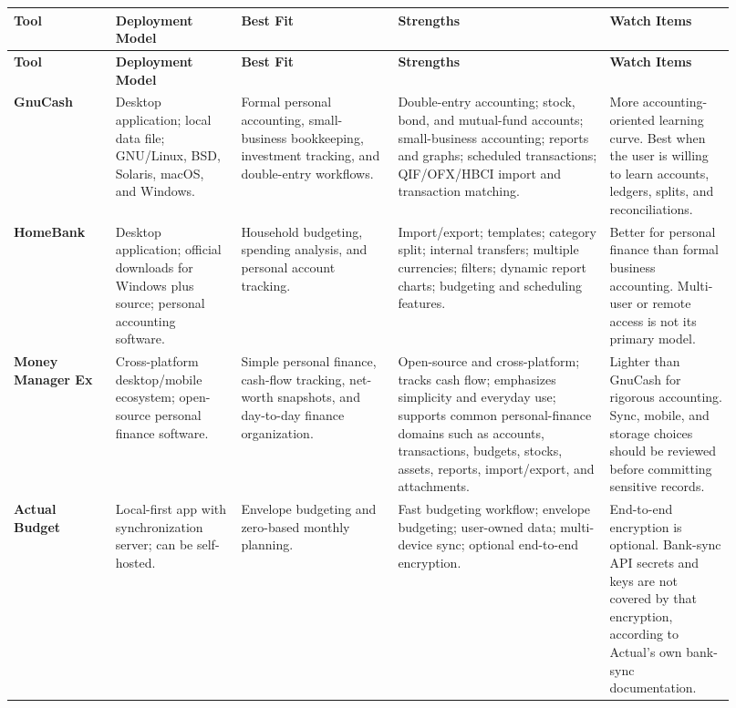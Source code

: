 \documentclass[11pt]{article}
\newcommand{\tool}[1]{\textbf{#1}}
\begin{document}
\begingroup
\small
{}
\begin{longtable}{>{\RaggedRight\arraybackslash}p{0.13\linewidth} >{\RaggedRight\arraybackslash}p{0.16\linewidth} >{\RaggedRight\arraybackslash}p{0.20\linewidth} >{\RaggedRight\arraybackslash}p{0.27\linewidth} >{\RaggedRight\arraybackslash}p{0.16\linewidth}}
\rowcolor{accentlight}\textbf{Tool} & \textbf{Deployment Model} & \textbf{Best Fit} & \textbf{Strengths} & \textbf{Watch Items} \\
\toprule
\endfirsthead
\rowcolor{accentlight}\textbf{Tool} & \textbf{Deployment Model} & \textbf{Best Fit} & \textbf{Strengths} & \textbf{Watch Items} \\
\toprule
\endhead
\tool{GnuCash} & Desktop application; local data file; GNU/Linux, BSD, Solaris, macOS, and Windows.\cite{gnucash-home} & Formal personal accounting, small-business bookkeeping, investment tracking, and double-entry workflows. & Double-entry accounting; stock, bond, and mutual-fund accounts; small-business accounting; reports and graphs; scheduled transactions; QIF/OFX/HBCI import and transaction matching.\cite{gnucash-home,gnucash-features} & More accounting-oriented learning curve. Best when the user is willing to learn accounts, ledgers, splits, and reconciliations. \\
\tool{HomeBank} & Desktop application; official downloads for Windows plus source; personal accounting software.\cite{homebank-home,homebank-downloads} & Household budgeting, spending analysis, and personal account tracking. & Import/export; templates; category split; internal transfers; multiple currencies; filters; dynamic report charts; budgeting and scheduling features.\cite{homebank-home} & Better for personal finance than formal business accounting. Multi-user or remote access is not its primary model. \\
\tool{Money Manager Ex} & Cross-platform desktop/mobile ecosystem; open-source personal finance software.\cite{mmex-home,mmex-docs} & Simple personal finance, cash-flow tracking, net-worth snapshots, and day-to-day finance organization. & Open-source and cross-platform; tracks cash flow; emphasizes simplicity and everyday use; supports common personal-finance domains such as accounts, transactions, budgets, stocks, assets, reports, import/export, and attachments.\cite{mmex-home,mmex-docs} & Lighter than GnuCash for rigorous accounting. Sync, mobile, and storage choices should be reviewed before committing sensitive records. \\
\tool{Actual Budget} & Local-first app with synchronization server; can be self-hosted.\cite{actual-home,actual-github} & Envelope budgeting and zero-based monthly planning. & Fast budgeting workflow; envelope budgeting; user-owned data; multi-device sync; optional end-to-end encryption.\cite{actual-home,actual-sync,actual-envelope} & End-to-end encryption is optional. Bank-sync API secrets and keys are not covered by that encryption, according to Actual's own bank-sync documentation.\cite{actual-bank-sync} \\

\end{longtable}
\end{document}
